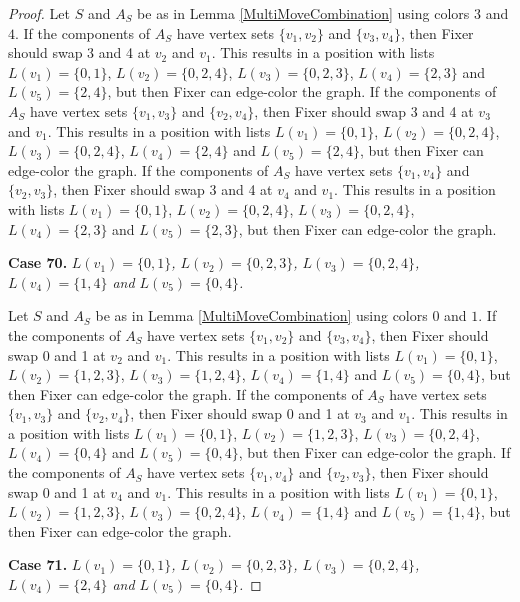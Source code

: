 \documentclass[12pt]{amsart}
\theoremstyle{plain}
\theoremstyle{definition}
\theoremstyle{remark}
\begin{document}
\begin{proof}
Let $S$ and $A_S$ be as in Lemma \ref{MultiMoveCombination} using colors $3$ and $4$. If the components of $A_S$ have vertex sets $\{v_1, v_2\}$ and $\{v_3, v_4\}$, then Fixer should swap 3 and 4 at $v_2$ and $v_1$. This results in a position with lists $L(v_1) = \{0, 1\}$, $L(v_2) = \{0, 2, 4\}$, $L(v_3) = \{0, 2, 3\}$, $L(v_4) = \{2, 3\}$ and $L(v_5) = \{2, 4\}$, but then Fixer can edge-color the graph.
If the components of $A_S$ have vertex sets $\{v_1, v_3\}$ and $\{v_2, v_4\}$, then Fixer should swap 3 and 4 at $v_3$ and $v_1$. This results in a position with lists $L(v_1) = \{0, 1\}$, $L(v_2) = \{0, 2, 4\}$, $L(v_3) = \{0, 2, 4\}$, $L(v_4) = \{2, 4\}$ and $L(v_5) = \{2, 4\}$, but then Fixer can edge-color the graph.
If the components of $A_S$ have vertex sets $\{v_1, v_4\}$ and $\{v_2, v_3\}$, then Fixer should swap 3 and 4 at $v_4$ and $v_1$. This results in a position with lists $L(v_1) = \{0, 1\}$, $L(v_2) = \{0, 2, 4\}$, $L(v_3) = \{0, 2, 4\}$, $L(v_4) = \{2, 3\}$ and $L(v_5) = \{2, 3\}$, but then Fixer can edge-color the graph.

\noindent\textbf{Case 70.  }\textit{$L(v_1) = \{0, 1\}$, $L(v_2) = \{0, 2, 3\}$, $L(v_3) = \{0, 2, 4\}$, $L(v_4) = \{1, 4\}$ and $L(v_5) = \{0, 4\}$.}

Let $S$ and $A_S$ be as in Lemma \ref{MultiMoveCombination} using colors $0$ and $1$. If the components of $A_S$ have vertex sets $\{v_1, v_2\}$ and $\{v_3, v_4\}$, then Fixer should swap 0 and 1 at $v_2$ and $v_1$. This results in a position with lists $L(v_1) = \{0, 1\}$, $L(v_2) = \{1, 2, 3\}$, $L(v_3) = \{1, 2, 4\}$, $L(v_4) = \{1, 4\}$ and $L(v_5) = \{0, 4\}$, but then Fixer can edge-color the graph.
If the components of $A_S$ have vertex sets $\{v_1, v_3\}$ and $\{v_2, v_4\}$, then Fixer should swap 0 and 1 at $v_3$ and $v_1$. This results in a position with lists $L(v_1) = \{0, 1\}$, $L(v_2) = \{1, 2, 3\}$, $L(v_3) = \{0, 2, 4\}$, $L(v_4) = \{0, 4\}$ and $L(v_5) = \{0, 4\}$, but then Fixer can edge-color the graph.
If the components of $A_S$ have vertex sets $\{v_1, v_4\}$ and $\{v_2, v_3\}$, then Fixer should swap 0 and 1 at $v_4$ and $v_1$. This results in a position with lists $L(v_1) = \{0, 1\}$, $L(v_2) = \{1, 2, 3\}$, $L(v_3) = \{0, 2, 4\}$, $L(v_4) = \{1, 4\}$ and $L(v_5) = \{1, 4\}$, but then Fixer can edge-color the graph.

\noindent\textbf{Case 71.  }\textit{$L(v_1) = \{0, 1\}$, $L(v_2) = \{0, 2, 3\}$, $L(v_3) = \{0, 2, 4\}$, $L(v_4) = \{2, 4\}$ and $L(v_5) = \{0, 4\}$.}


\end{proof}
\end{document}
